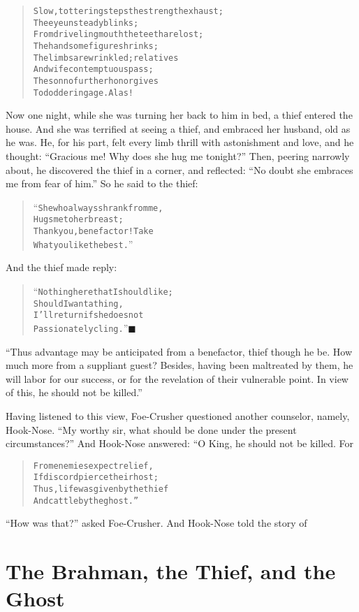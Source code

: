 \documentclass[article, twoside, 14pt]{memoir}
\newcommand{\qed}{\hfill \ensuremath{\blacksquare}}
\renewenvironment{verbatim}{%
\begin{quote}%
\vskip -10pt%
\begin{alltt}\normalfont\large}{\end{alltt}%
\end{quote}%
\vskip -10pt
} %
\begin{document}
\begin{verbatim}
Slow, tottering steps the strength exhaust;
    The eye unsteady blinks;
From driveling mouth the teeth are lost;
    The handsome figure shrinks;
The limbs are wrinkled; relatives
    And wife contemptuous pass;
The son no further honor gives
    To doddering age. Alas!
\end{verbatim}
Now one night, while she was turning her back to him in bed, a
thief entered the house. And she was terrified at seeing a
thief, and embraced her husband, old as he was. He, for his part,
felt every limb thrill with astonishment and love, and he thought:
``Gracious me! Why does she hug me tonight?'' Then, peering
narrowly about, he discovered the thief in a corner, and reflected:
``No doubt she embraces me from fear of him.'' So he said to the
thief:

\begin{verbatim}
“She who always shrank from me,
Hugs me to her breast;
Thank you, benefactor! Take
What you like the best.”
\end{verbatim}
And the thief made reply:

\begin{verbatim}
“Nothing here that I should like;
Should I want a thing,
I'll return if she does not
Passionately cling.”\hyperref[s56]{\qed}
\end{verbatim}
``Thus advantage may be anticipated from a benefactor, thief though he be. How much more from a suppliant guest? Besides, having been maltreated by them, he will labor for our success, or for the revelation of their vulnerable point. In view of this, he should not be killed.''

Having listened to this view, Foe-Crusher questioned another
counselor, namely, Hook-Nose.
``My worthy sir, what should be done under the present circumstances?''
And Hook-Nose answered: “O King, he should not be killed. For

\begin{verbatim}
From enemies expect relief,
    If discord pierce their host;
Thus, life was given by the thief
    And cattle by the ghost.”
\end{verbatim}
``How was that?'' asked Foe-Crusher. And Hook-Nose told the story
of

\chapter{The Brahman, the Thief, and the Ghost}
\end{document}
